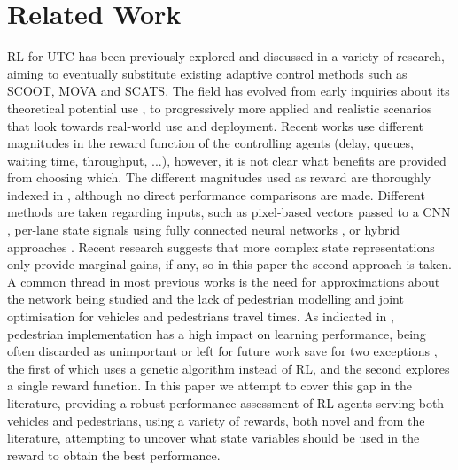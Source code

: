 \documentclass[conference]{IEEEtran}
\begin{document}
\section{Related Work}
\label{lit}
RL for UTC has been previously explored and discussed in a variety of research, aiming to eventually substitute existing adaptive control methods such as SCOOT\cite{scoot}, MOVA\cite{mova} and SCATS\cite{scats}.
The field has evolved from early inquiries about its theoretical potential use \cite{wiering2000} \cite{abdul2003} \cite{pra2010} \cite{abdulhai2010} \cite{abdoos2011}, to progressively more applied and realistic scenarios that look towards real-world use and deployment.
Recent works use different magnitudes in the reward function of the controlling agents (delay, queues, waiting time, throughput, ...), however, it is not clear what benefits are provided from choosing which.
The different magnitudes used as reward are thoroughly indexed in \cite{yau} \cite{survey2020} \cite{survey2020wei}, although no direct performance comparisons are made.
Different methods are taken regarding inputs, such as pixel-based vectors passed to a CNN \cite{liang2017} \cite{gao2017} \cite{mousavi2017}, per-lane state signals using fully connected neural networks \cite{survey2014} \cite{aslani2019} \cite{genders2019}, or hybrid approaches \cite{genders2016} \cite{gendersthesis} \cite{wan2018}.
Recent research suggests that more complex state representations only provide marginal gains, if any\cite{gendersstate}, so in this paper the second approach is taken.
A common thread in most previous works is the need for approximations about the network being studied and the lack of pedestrian modelling and joint optimisation for vehicles and pedestrians travel times.
As indicated in \cite{survey2020}, pedestrian implementation has a high impact on learning performance, being often discarded as unimportant or left for future work save for two exceptions \cite{geneticped} \cite{liu2017}, the first of which uses a genetic algorithm instead of RL, and the second explores a single reward function.
In this paper we attempt to cover this gap in the literature, providing a robust performance assessment of RL agents serving both vehicles and pedestrians, using a variety of rewards, both novel and from the literature, attempting to uncover what state variables should be used in the reward to obtain the best performance.
\end{document}
